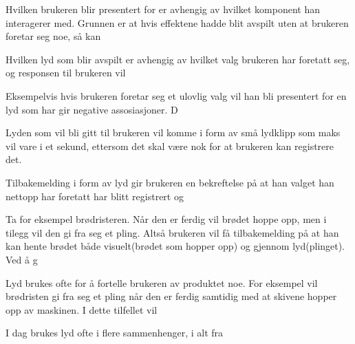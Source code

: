 Hvilken brukeren blir presentert for er avhengig av hvilket komponent han interagerer med.  Grunnen er at hvis effektene hadde blit avspilt uten at brukeren foretar seg noe, så kan 
 
Hvilken lyd som blir avspilt er avhengig av hvilket valg brukeren har foretatt seg, og responsen til brukeren vil  
 
Eksempelvis hvis brukeren foretar seg et ulovlig valg vil han bli presentert for en lyd som har gir negative assosiasjoner.  D 
 
Lyden som vil bli gitt til brukeren vil komme i form av små lydklipp som maks vil vare i et sekund,  ettersom det skal være nok for at brukeren kan registrere det.  
 
 Tilbakemelding i form av lyd gir brukeren en bekreftelse på at han valget han nettopp har foretatt har blitt registrert og  
 
Ta for eksempel brødristeren. Når den er ferdig vil brødet hoppe opp, men i tilegg vil den gi fra seg et pling. Altså brukeren vil få tilbakemelding på at han kan hente brødet både visuelt(brødet som hopper opp) og gjennom lyd(plinget). Ved å g 
 
Lyd brukes ofte for å fortelle brukeren av produktet noe. For eksempel vil brødristen gi fra seg et pling når den er ferdig samtidig med at skivene hopper opp av maskinen. I dette tilfellet vil  
 
 
I dag brukes lyd ofte i flere sammenhenger, i alt fra 
 
 
 
